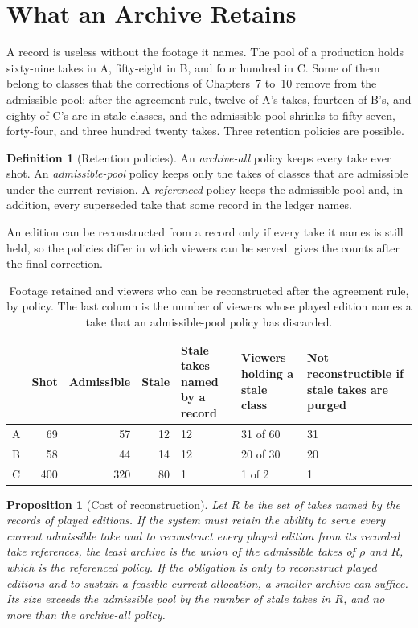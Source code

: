 \documentclass[11pt,twoside,openright]{book}
\theoremstyle{plain}
\newtheorem{proposition}[theorem]{Proposition}
\theoremstyle{definition}
\newtheorem{definition}[theorem]{Definition}
\theoremstyle{remark}
\begin{document}
\section{What an Archive Retains}\label{sec:archive}

A record is useless without the footage it names. The pool of a production holds sixty-nine takes in A, fifty-eight in B, and four hundred in C. Some of them belong to classes that the corrections of Chapters~7 to~10 remove from the admissible pool: after the agreement rule, twelve of A's takes, fourteen of B's, and eighty of C's are in stale classes, and the admissible pool shrinks to fifty-seven, forty-four, and three hundred twenty takes. Three retention policies are possible.

\begin{definition}[Retention policies]
An \emph{archive-all} policy keeps every take ever shot. An \emph{admissible-pool} policy keeps only the takes of classes that are admissible under the current revision. A \emph{referenced} policy keeps the admissible pool and, in addition, every superseded take that some record in the ledger names.
\end{definition}

An edition can be reconstructed from a record only if every take it names is still held, so the policies differ in which viewers can be served.  gives the counts after the final correction.

\begin{table}[ht]
\centering
\begin{tabular}{@{}lrrrp{2.1cm}p{2.2cm}p{2.4cm}@{}}
\toprule
 & Shot & Admissible & Stale & Stale takes named by a record & Viewers holding a stale class & Not reconstructible if stale takes are purged\\
\midrule
A & 69 & 57 & 12 & 12 & 31 of 60 & 31\\
B & 58 & 44 & 14 & 12 & 20 of 30 & 20\\
C & 400 & 320 & 80 & 1 & 1 of 2 & 1\\
\bottomrule
\end{tabular}
\caption{Footage retained and viewers who can be reconstructed after the agreement rule, by policy. The last column is the number of viewers whose played edition names a take that an admissible-pool policy has discarded.}\label{tab:ret12}
\end{table}

\begin{proposition}[Cost of reconstruction]\label{prop:retain}
Let $R$ be the set of takes named by the records of played editions. If the system must retain the ability to serve every current admissible take and to reconstruct every played edition from its recorded take references, the least archive is the union of the admissible takes of $\rho$ and $R$, which is the referenced policy. If the obligation is only to reconstruct played editions and to sustain a feasible current allocation, a smaller archive can suffice. Its size exceeds the admissible pool by the number of stale takes in $R$, and no more than the archive-all policy.
\end{proposition}
\end{document}
